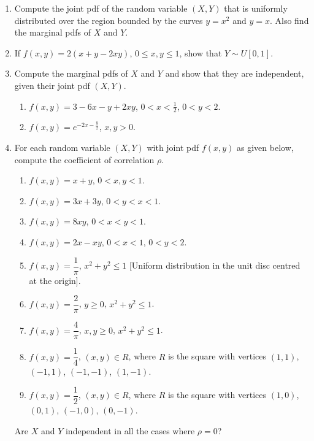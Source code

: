 \documentclass[svgnames]{amsart}
\begin{document}
\begin{enumerate}[leftmargin=*, itemsep=0.3em]
\item Compute the joint pdf of the random variable $(X, Y)$ that is uniformly distributed over the region bounded by the curves $y = x^2$ and $y = x$. Also find the marginal pdfs of $X$ and $Y$.

\item If $f(x, y) = 2(x + y - 2xy)$, $0 \le x, y \le 1$, show that $Y \sim U[0, 1]$.

\item Compute the marginal pdfs of $X$ and $Y$ and show that they are independent, given their joint pdf $(X, Y)$.
\begin{enumerate}
	\item $f(x, y) = 3 - 6x - y + 2xy$, $0 < x < \frac 1 2$, $0 < y < 2$.
	\item $f(x, y) = e^{-2x - \frac y 2}$, $x, y > 0$.
\end{enumerate}

\item For each random variable $(X, Y)$ with joint pdf $f(x, y)$ as given below, compute the coefficient of correlation $\rho$.
\begin{enumerate}
	\item $f(x, y) = x + y$, $0 < x, y < 1$.
	\item $f(x, y) = 3x + 3y$, $0 < y < x < 1$.
    \item $f(x, y) = 8xy$, $0 < x < y < 1$.
	\item $f(x, y) = 2x - xy$, $0 < x < 1$, $0 < y < 2$.
	\item $f(x, y) = \dfrac 1 \pi$, $x^2 + y^2 \le 1$ [Uniform distribution in the unit disc centred at the origin].
	\item $f(x, y) = \dfrac 2 \pi$, $y \ge 0$, $x^2 + y^2 \le 1$.
	\item $f(x, y) = \dfrac 4 \pi$, $x,y \ge 0$, $x^2 + y^2 \le 1$.
	\item $f(x, y) = \dfrac 1 4$, $(x, y) \in R$, where $R$ is the square with vertices $(1, 1)$, $(-1, 1)$, $(-1, -1)$, $(1, -1)$.
	\item $f(x, y) = \dfrac 1 2$, $(x, y) \in R$, where $R$ is the square with vertices $(1, 0)$, $(0, 1)$, $(-1, 0)$, $(0, -1)$.
\end{enumerate}
Are $X$ and $Y$ independent in all the cases where $\rho = 0$?
\end{enumerate}
\end{document}
